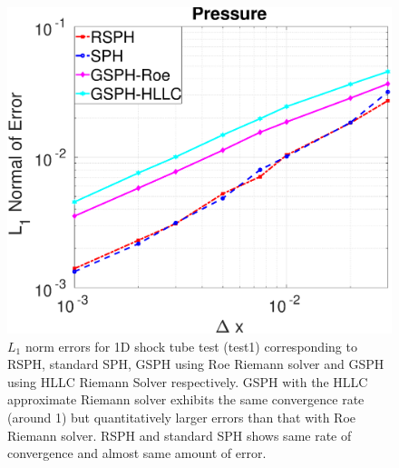 \begin{figure}
\begin{minipage}{.332 \textwidth}
    \end{minipage}%
    \begin{minipage}{.332\textwidth}
        \centering
        \includegraphics[width=0.99 \textwidth]{Chapter-4/Figures/Accuracy-pre}
    \end{minipage}%
    \caption{ $L_1$ norm errors for 1D shock tube test (test1) corresponding to RSPH, standard SPH, GSPH using Roe Riemann solver and GSPH using HLLC Riemann Solver respectively.  GSPH with the HLLC approximate Riemann solver exhibits the same convergence rate (around 1) but quantitatively larger errors than that with Roe Riemann solver. RSPH and standard SPH shows same rate of convergence and almost same amount of error.}
    \label{fig:Accuracy-test1}
\end{figure}
 
